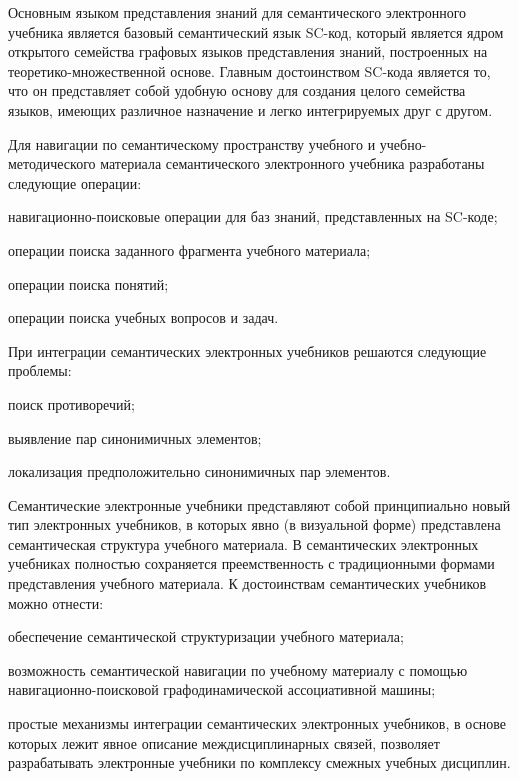 Основным языком представления знаний для семантического электронного учебника является базовый семантический язык SC-код, который является ядром открытого семейства графовых языков представления знаний, построенных на теоретико-множественной основе. Главным достоинством SC-кода является то, что он представляет собой удобную основу для создания целого семейства языков, имеющих различное назначение и легко интегрируемых друг с другом.

Для навигации по семантическому пространству учебного и учебно-методического материала семантического электронного учебника разработаны следующие операции:

\begin{textitemize}
	\item навигационно-поисковые операции для баз знаний, представленных на SC-коде;
	\item операции поиска заданного фрагмента учебного материала;
	\item операции поиска понятий;
	\item операции поиска учебных вопросов и задач.
\end{textitemize}

При интеграции семантических электронных учебников решаются следующие проблемы:

\begin{textitemize}
	\item поиск противоречий;
	\item выявление пар синонимичных элементов;
	\item локализация предположительно синонимичных пар элементов.
\end{textitemize}

Семантические электронные учебники представляют собой принципиально новый тип электронных учебников, в которых явно (в визуальной форме) представлена семантическая структура учебного материала. В семантических электронных учебниках полностью сохраняется преемственность с традиционными формами представления учебного материала. К достоинствам семантических учебников можно отнести:

\begin{textitemize}
	\item
	обеспечение семантической структуризации учебного материала;
	\item
	возможность семантической навигации по учебному материалу с помощью навигационно-поисковой графодинамической ассоциативной машины;
	\item
	простые механизмы интеграции семантических электронных учебников, в основе которых лежит явное описание междисциплинарных связей, позволяет разрабатывать электронные учебники по комплексу смежных учебных дисциплин.
\end{textitemize}

